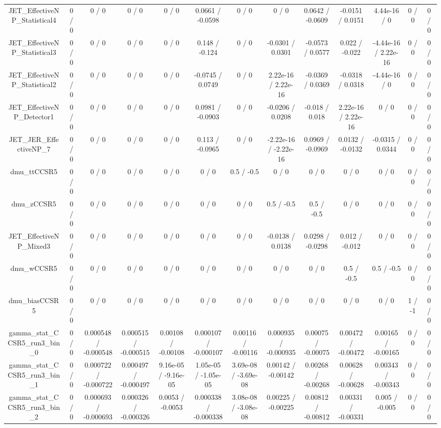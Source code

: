 \documentclass[10pt]{article}
\begin{document}
\begin{table}[htbp]
\begin{center}
\begin{tabular}{|c|c|c|c|c|c|c|c|c|c|c|c|c|}
  JET_EffectiveNP_Statistical4 & 0 / 0 & 0 / 0 & 0 / 0 & 0 / 0 & 0.0661 / -0.0598 & 0 / 0 & 0 / 0 & 0.0642 / -0.0609 & -0.0151 / 0.0151 & 4.44e-16 / 0 & 0 / 0 & 0 / 0 \\ 
  JET_EffectiveNP_Statistical3 & 0 / 0 & 0 / 0 & 0 / 0 & 0 / 0 & 0.148 / -0.124 & 0 / 0 & -0.0301 / 0.0301 & -0.0573 / 0.0577 & 0.022 / -0.022 & -4.44e-16 / 2.22e-16 & 0 / 0 & 0 / 0 \\ 
  JET_EffectiveNP_Statistical2 & 0 / 0 & 0 / 0 & 0 / 0 & 0 / 0 & -0.0745 / 0.0749 & 0 / 0 & 2.22e-16 / 2.22e-16 & -0.0369 / 0.0369 & -0.0318 / 0.0318 & -4.44e-16 / 0 & 0 / 0 & 0 / 0 \\ 
  JET_EffectiveNP_Detector1 & 0 / 0 & 0 / 0 & 0 / 0 & 0 / 0 & 0.0981 / -0.0903 & 0 / 0 & -0.0206 / 0.0208 & -0.018 / 0.018 & 2.22e-16 / 2.22e-16 & 0 / 0 & 0 / 0 & 0 / 0 \\ 
  JET_JER_EffectiveNP_7 & 0 / 0 & 0 / 0 & 0 / 0 & 0 / 0 & 0.113 / -0.0965 & 0 / 0 & -2.22e-16 / -2.22e-16 & 0.0969 / -0.0969 & 0.0132 / -0.0132 & -0.0315 / 0.0344 & 0 / 0 & 0 / 0 \\ 
  dmu_ttCCSR5 & 0 / 0 & 0 / 0 & 0 / 0 & 0 / 0 & 0 / 0 & 0.5 / -0.5 & 0 / 0 & 0 / 0 & 0 / 0 & 0 / 0 & 0 / 0 & 0 / 0 \\ 
  dmu_zCCSR5 & 0 / 0 & 0 / 0 & 0 / 0 & 0 / 0 & 0 / 0 & 0 / 0 & 0.5 / -0.5 & 0.5 / -0.5 & 0 / 0 & 0 / 0 & 0 / 0 & 0 / 0 \\ 
  JET_EffectiveNP_Mixed3 & 0 / 0 & 0 / 0 & 0 / 0 & 0 / 0 & 0 / 0 & 0 / 0 & -0.0138 / 0.0138 & 0.0298 / -0.0298 & 0.012 / -0.012 & 0 / 0 & 0 / 0 & 0 / 0 \\ 
  dmu_wCCSR5 & 0 / 0 & 0 / 0 & 0 / 0 & 0 / 0 & 0 / 0 & 0 / 0 & 0 / 0 & 0 / 0 & 0.5 / -0.5 & 0.5 / -0.5 & 0 / 0 & 0 / 0 \\ 
  dmu_biasCCSR5 & 0 / 0 & 0 / 0 & 0 / 0 & 0 / 0 & 0 / 0 & 0 / 0 & 0 / 0 & 0 / 0 & 0 / 0 & 0 / 0 & 1 / -1 & 0 / 0 \\ 
  gamma_stat_CCSR5_run3_bin_0 & 0 / 0 & 0.000548 / -0.000548 & 0.000515 / -0.000515 & 0.00108 / -0.00108 & 0.000107 / -0.000107 & 0.00116 / -0.00116 & 0.000935 / -0.000935 & 0.00075 / -0.00075 & 0.00472 / -0.00472 & 0.00165 / -0.00165 & 0 / 0 & 0 / 0 \\ 
  gamma_stat_CCSR5_run3_bin_1 & 0 / 0 & 0.000722 / -0.000722 & 0.000497 / -0.000497 & 9.16e-05 / -9.16e-05 & 1.05e-05 / -1.05e-05 & 3.69e-08 / -3.69e-08 & 0.00142 / -0.00142 & 0.00268 / -0.00268 & 0.00628 / -0.00628 & 0.00343 / -0.00343 & 0 / 0 & 0 / 0 \\ 
  gamma_stat_CCSR5_run3_bin_2 & 0 / 0 & 0.000693 / -0.000693 & 0.000326 / -0.000326 & 0.0053 / -0.0053 & 0.000338 / -0.000338 & 3.08e-08 / -3.08e-08 & 0.00225 / -0.00225 & 0.00812 / -0.00812 & 0.00331 / -0.00331 & 0.005 / -0.005 & 0 / 0 & 0 / 0 \\ 

\end{tabular}
\end{center}
\end{table}
\end{document}
